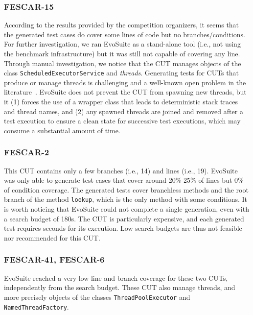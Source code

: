 \documentclass[sigconf]{acmart}
\newcommand{\EVOSUITE}{{\sc EvoSuite}\xspace}
\begin{document}
\subsubsection*{FESCAR-15} According to the results provided by the competition
organizers, it seems that the generated test cases do cover some lines of code
but no branches/conditions.
For further investigation, we ran \EVOSUITE as a stand-alone tool (i.e., not using the benchmark infrastructure) but it was still not capable of covering any line. Through manual investigation, we notice that the CUT manages objects of the class \texttt{ScheduledExecutorService} and \textit{threads}. Generating tests for CUTs that produce or manage threads is challenging and a well-known open problem in the literature~\cite{FrA13a}. \EVOSUITE does not prevent the CUT from spawning new threads, but it (1) forces the use of a wrapper class that leads to deterministic stack traces and thread names, and (2) any spawned threads are joined and removed after a test execution to ensure a clean state for successive test executions, which may consume a substantial amount of time.


\subsubsection*{FESCAR-2} This CUT contains only a few branches (i.e., 14) and lines (i.e., 19). \EVOSUITE was only able to generate test cases that cover around 20\%-25\% of lines but 0\% of condition coverage. The generated tests cover branchless methods and the root branch of the method \texttt{lookup}, which is the only method with some conditions. It is worth noticing that \EVOSUITE could not complete a single generation, even with a search budget of 180s. The CUT is particularly expensive, and each generated test requires seconds for its execution. Low search budgets are thus not feasible nor recommended for this CUT.

\subsubsection*{FESCAR-41, FESCAR-6} \EVOSUITE reached a very low line and branch coverage for these two CUTs, independently from the search budget. These CUT also manage threads, and more precisely objects of the classes \texttt{ThreadPoolExecutor} and \texttt{NamedThreadFactory}.
\end{document}
